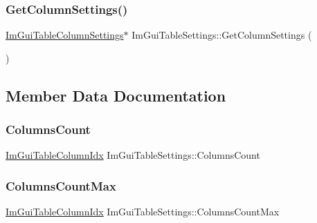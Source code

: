 \subsubsection{\texorpdfstring{Get\+Column\+Settings()}{GetColumnSettings()}}
{\footnotesize\ttfamily \hyperlink{structImGuiTableColumnSettings}{Im\+Gui\+Table\+Column\+Settings}$\ast$ Im\+Gui\+Table\+Settings\+::\+Get\+Column\+Settings (\begin{DoxyParamCaption}{ }\end{DoxyParamCaption})\hspace{0.3cm}{\ttfamily [inline]}}



\subsection{Member Data Documentation}
\mbox{\label{structImGuiTableSettings_ae7802faa283782844c7d6f822e51fd98}} 
\subsubsection{\texorpdfstring{Columns\+Count}{ColumnsCount}}
{\footnotesize\ttfamily \hyperlink{imgui__internal_8h_abe1882c8292cd23a77a54eda2407f147}{Im\+Gui\+Table\+Column\+Idx} Im\+Gui\+Table\+Settings\+::\+Columns\+Count}

\mbox{\label{structImGuiTableSettings_ac8dab6d2b13a5a77217d24ea237eecc1}} 
\subsubsection{\texorpdfstring{Columns\+Count\+Max}{ColumnsCountMax}}
{\footnotesize\ttfamily \hyperlink{imgui__internal_8h_abe1882c8292cd23a77a54eda2407f147}{Im\+Gui\+Table\+Column\+Idx} Im\+Gui\+Table\+Settings\+::\+Columns\+Count\+Max}

\mbox{\label{structImGuiTableSettings_affa6cd90f4357ed81f37396094911d96}} 

